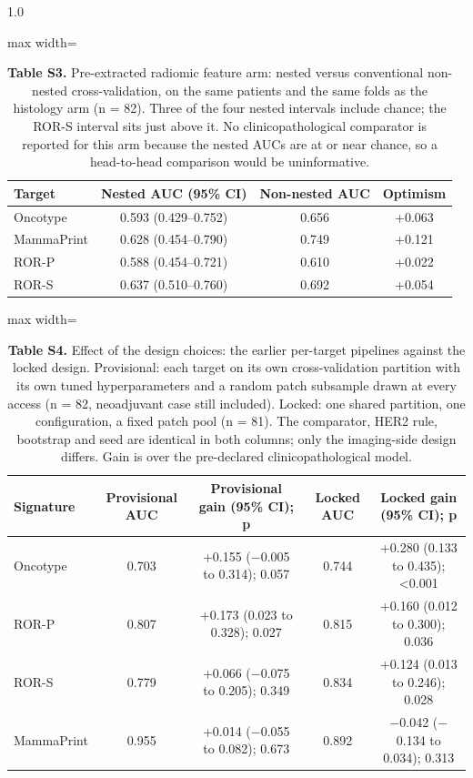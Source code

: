 \documentclass[11pt,a4paper]{article}
\begin{document}
\begin{spacing}{1.0}
\begin{table}[htbp]\centering\small
\caption*{\textbf{Table S3.} Pre-extracted radiomic feature arm: nested versus conventional non-nested cross-validation, on the same patients and the same folds as the histology arm (n = 82). Three of the four nested intervals include chance; the ROR-S interval sits just above it. No clinicopathological comparator is reported for this arm because the nested AUCs are at or near chance, so a head-to-head comparison would be uninformative.}
\begin{adjustbox}{max width=\textwidth}
\begin{tabular}{@{}lccc@{}}
\toprule
\textbf{Target} & \textbf{Nested AUC (95\% CI)} & \textbf{Non-nested AUC} & \textbf{Optimism} \\
\midrule
Oncotype & 0.593 (0.429--0.752) & 0.656 & +0.063 \\
MammaPrint & 0.628 (0.454--0.790) & 0.749 & +0.121 \\
ROR-P & 0.588 (0.454--0.721) & 0.610 & +0.022 \\
ROR-S & 0.637 (0.510--0.760) & 0.692 & +0.054 \\
\bottomrule
\end{tabular}
\end{adjustbox}\end{table}

\begin{table}[htbp]\centering\small
\caption*{\textbf{Table S4.} Effect of the design choices: the earlier per-target pipelines against the locked design. Provisional: each target on its own cross-validation partition with its own tuned hyperparameters and a random patch subsample drawn at every access (n = 82, neoadjuvant case still included). Locked: one shared partition, one configuration, a fixed patch pool (n = 81). The comparator, HER2 rule, bootstrap and seed are identical in both columns; only the imaging-side design differs. Gain is over the pre-declared clinicopathological model.}
\begin{adjustbox}{max width=\textwidth}
\begin{tabular}{@{}lcccc@{}}
\toprule
\textbf{Signature} & \textbf{Provisional AUC} & \textbf{Provisional gain (95\% CI); p} & \textbf{Locked AUC} & \textbf{Locked gain (95\% CI); p} \\
\midrule
Oncotype & 0.703 & +0.155 ($-$0.005 to 0.314); 0.057 & 0.744 & +0.280 (0.133 to 0.435); <0.001 \\
ROR-P & 0.807 & +0.173 (0.023 to 0.328); 0.027 & 0.815 & +0.160 (0.012 to 0.300); 0.036 \\
ROR-S & 0.779 & +0.066 ($-$0.075 to 0.205); 0.349 & 0.834 & +0.124 (0.013 to 0.246); 0.028 \\
MammaPrint & 0.955 & +0.014 ($-$0.055 to 0.082); 0.673 & 0.892 & $-$0.042 ($-$0.134 to 0.034); 0.313 \\
\bottomrule
\end{tabular}
\end{adjustbox}\end{table}


\end{spacing}
\end{document}
